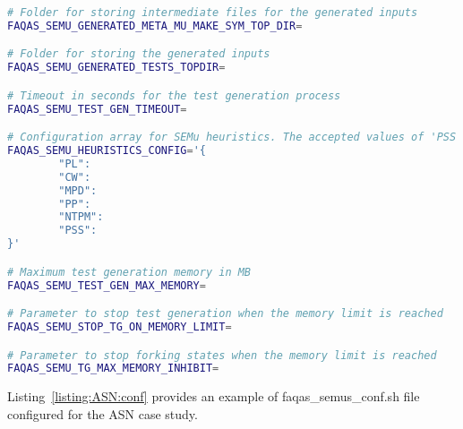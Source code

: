 \begin{lstlisting}[language=bash,label=listing:SEMUS:conf,caption=faqas\_semus\_conf.sh file.]
# Folder for storing intermediate files for the generated inputs 
FAQAS_SEMU_GENERATED_META_MU_MAKE_SYM_TOP_DIR=

# Folder for storing the generated inputs 
FAQAS_SEMU_GENERATED_TESTS_TOPDIR=

# Timeout in seconds for the test generation process
FAQAS_SEMU_TEST_GEN_TIMEOUT=

# Configuration array for SEMu heuristics. The accepted values of 'PSS' are 'RND' for random and 'MDO' for minimum distance to output
FAQAS_SEMU_HEURISTICS_CONFIG='{
        "PL": 
        "CW": 
        "MPD": 
        "PP": 
        "NTPM": 
        "PSS": 
}'

# Maximum test generation memory in MB
FAQAS_SEMU_TEST_GEN_MAX_MEMORY=

# Parameter to stop test generation when the memory limit is reached
FAQAS_SEMU_STOP_TG_ON_MEMORY_LIMIT=

# Parameter to stop forking states when the memory limit is reached
FAQAS_SEMU_TG_MAX_MEMORY_INHIBIT=

\end{lstlisting}


Listing~\ref{listing:ASN:conf} provides an example of faqas\_semus\_conf.sh file configured for the ASN case study.

